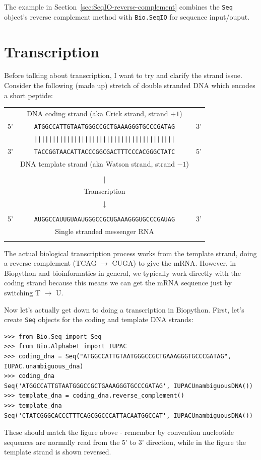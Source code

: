 \documentclass{report}
\begin{document}
The example in Section~\ref{sec:SeqIO-reverse-complement} combines the \verb|Seq|
object's reverse complement method with \verb|Bio.SeqIO| for sequence input/ouput.

\section{Transcription}
Before talking about transcription, I want to try and clarify the strand issue.
Consider the following (made up) stretch of double stranded DNA which
encodes a short peptide:

\begin{tabular}{rcl}
\\
   & {\small DNA coding strand (aka Crick strand, strand $+1$)} & \\
5' & \texttt{ATGGCCATTGTAATGGGCCGCTGAAAGGGTGCCCGATAG} & 3' \\
   & \texttt{|||||||||||||||||||||||||||||||||||||||} & \\
3' & \texttt{TACCGGTAACATTACCCGGCGACTTTCCCACGGGCTATC} & 5' \\
   & {\small DNA template strand (aka Watson strand, strand $-1$)} & \\
\\
   & {\LARGE $|$} &\\
   & Transcription & \\
   & {\LARGE $\downarrow$} &\\
\\
5' & \texttt{AUGGCCAUUGUAAUGGGCCGCUGAAAGGGUGCCCGAUAG} & 3' \\
   & {\small Single stranded messenger RNA} & \\
\\
\end{tabular}

The actual biological transcription process works from the template strand, doing a reverse complement (TCAG $\rightarrow$ CUGA) to give the mRNA.  However, in Biopython and bioinformatics in general, we typically work directly with the coding strand because this means we can get the mRNA sequence just by switching T $\rightarrow$ U.

Now let's actually get down to doing a transcription in Biopython.  First, let's create \verb|Seq| objects for the coding and template DNA strands:
\begin{verbatim}
>>> from Bio.Seq import Seq
>>> from Bio.Alphabet import IUPAC
>>> coding_dna = Seq("ATGGCCATTGTAATGGGCCGCTGAAAGGGTGCCCGATAG", IUPAC.unambiguous_dna)
>>> coding_dna
Seq('ATGGCCATTGTAATGGGCCGCTGAAAGGGTGCCCGATAG', IUPACUnambiguousDNA())
>>> template_dna = coding_dna.reverse_complement()
>>> template_dna
Seq('CTATCGGGCACCCTTTCAGCGGCCCATTACAATGGCCAT', IUPACUnambiguousDNA())
\end{verbatim}
\noindent These should match the figure above - remember by convention nucleotide sequences are normally read from the 5' to 3' direction, while in the figure the template strand is shown reversed.
\end{document}
